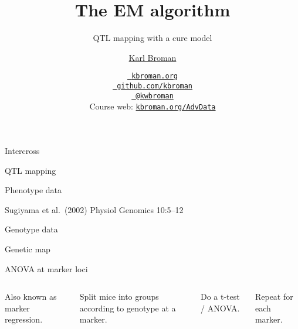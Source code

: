 \documentclass[aspectratio=169,12pt,t]{beamer}
\title{The EM algorithm}
\subtitle{QTL mapping with a cure model}
\author{\href{https://kbroman.org}{Karl Broman}}
\institute{Biostatistics \& Medical Informatics, UW{\textendash}Madison}
\date{\href{https://kbroman.org}{\tt \scriptsize \color{foreground} kbroman.org}
\\[-4pt]
\href{https://github.com/kbroman}{\tt \scriptsize \color{foreground} github.com/kbroman}
\\[-4pt]
\href{https://twitter.com/kwbroman}{\tt \scriptsize \color{foreground} @kwbroman}
\\[-4pt]
{\scriptsize Course web: \href{https://kbroman.org/AdvData}{\tt kbroman.org/AdvData}}
}
\begin{document}
{
\frame{
  \titlepage

  \note{}

} }



\begin{frame}[c]{Intercross}
\end{frame}





\begin{frame}[c]{QTL mapping}

\vspace{5mm}
\end{frame}




\begin{frame}[c]{Phenotype data}

\vspace{5mm}

{\lolit \footnotesize
Sugiyama et al.\ (2002) Physiol Genomics 10:5--12
}
\end{frame}


\begin{frame}[c]{Genotype data}
\end{frame}


\begin{frame}[c]{Genetic map}
\end{frame}



\begin{frame}[c]{ANOVA at marker loci}

\begin{columns}

\bi
\item Also known as {\hilit marker regression}.
\item Split mice into groups according to genotype at a marker.
\item Do a t-test / ANOVA.
\item Repeat for each marker.
\ei



\end{columns}
\end{frame}
\end{document}
